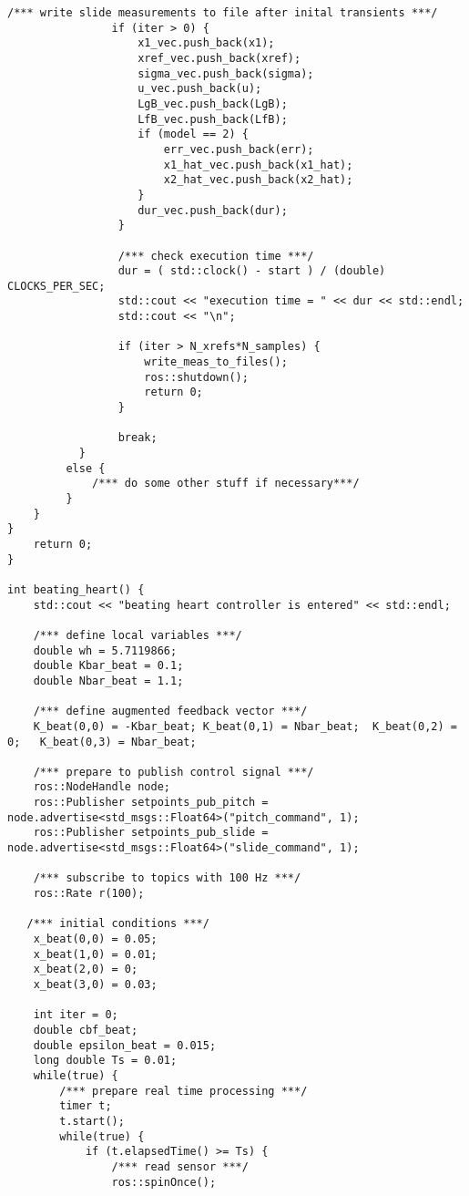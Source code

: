\begin{lstlisting}[language=gedit]
                /*** write slide measurements to file after inital transients ***/
                if (iter > 0) {
                    x1_vec.push_back(x1);
                    xref_vec.push_back(xref);
                    sigma_vec.push_back(sigma);
                    u_vec.push_back(u);
                    LgB_vec.push_back(LgB);
                    LfB_vec.push_back(LfB);
                    if (model == 2) {
                        err_vec.push_back(err);
                        x1_hat_vec.push_back(x1_hat);
                        x2_hat_vec.push_back(x2_hat);
                    }
                    dur_vec.push_back(dur);
                 }

                 /*** check execution time ***/
                 dur = ( std::clock() - start ) / (double) CLOCKS_PER_SEC;
                 std::cout << "execution time = " << dur << std::endl; 
                 std::cout << "\n";

                 if (iter > N_xrefs*N_samples) {
                     write_meas_to_files();
                     ros::shutdown();
                     return 0;
                 }

                 break;
           }
         else {
             /*** do some other stuff if necessary***/
         }
    }
}
    return 0;
}
                    
int beating_heart() {
    std::cout << "beating heart controller is entered" << std::endl;

    /*** define local variables ***/
    double wh = 5.7119866;
    double Kbar_beat = 0.1;
    double Nbar_beat = 1.1;

    /*** define augmented feedback vector ***/
    K_beat(0,0) = -Kbar_beat; K_beat(0,1) = Nbar_beat;  K_beat(0,2) = 0;   K_beat(0,3) = Nbar_beat;

    /*** prepare to publish control signal ***/ 
    ros::NodeHandle node;
    ros::Publisher setpoints_pub_pitch = node.advertise<std_msgs::Float64>("pitch_command", 1);
    ros::Publisher setpoints_pub_slide = node.advertise<std_msgs::Float64>("slide_command", 1);

    /*** subscribe to topics with 100 Hz ***/
    ros::Rate r(100);

   /*** initial conditions ***/
    x_beat(0,0) = 0.05;    
    x_beat(1,0) = 0.01;   
    x_beat(2,0) = 0;   
    x_beat(3,0) = 0.03;

    int iter = 0;
    double cbf_beat;
    double epsilon_beat = 0.015;
    long double Ts = 0.01;
    while(true) {
        /*** prepare real time processing ***/
        timer t;
        t.start();
        while(true) {
            if (t.elapsedTime() >= Ts) {
                /*** read sensor ***/ 
                ros::spinOnce();


\end{lstlisting}
